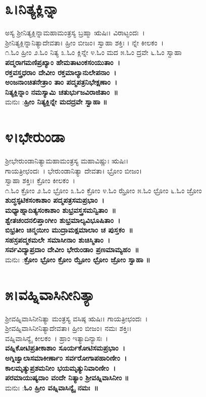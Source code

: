 \section{೩।ನಿತ್ಯಕ್ಲಿನ್ನಾ}
ಅಸ್ಯ ಶ್ರೀನಿತ್ಯಕ್ಲಿನ್ನಾಮಹಾಮಂತ್ರಸ್ಯ ಬ್ರಹ್ಮಾ ಋಷಿಃ। ವಿರಾಟ್ಛಂದಃ~।\\ ಶ್ರೀನಿತ್ಯಕ್ಲಿನ್ನಾನಿತ್ಯಾದೇವತಾ। ಹ್ರೀಂ ಬೀಜಂ। ಸ್ವಾಹಾ ಶಕ್ತಿಃ । ನ್ನೇ ಕೀಲಕಂ~।\\
೧.ಓಂ ಹ್ರೀಂ ೨.ಓಂ ನಿತ್ಯ  ೩.ಓಂ ಕ್ಲಿನ್ನೇ ೪.ಓಂ ಮದ ೫.ಓಂ ದ್ರವೇ ೬.ಓಂ ಸ್ವಾಹಾ\\
{\bfseries ಪದ್ಮರಾಗಮಣಿಪ್ರಖ್ಯಾಂ ಹೇಮತಾಟಂಕಸಂಯುತಾಂ~।\\
ರಕ್ತವಸ್ತ್ರಧರಾಂ ದೇವೀಂ ರಕ್ತಮಾಲ್ಯಾನುಲೇಪನಾಂ~।\\
ಅಂಜನಾಂಚಿತನೇತ್ರಾಂ ತಾಂ ಪದ್ಮಪತ್ರನಿಭೇಕ್ಷಣಾಂ~।\\
ನಿತ್ಯಕ್ಲಿನ್ನಾಂ ನಮಸ್ಯಾಮಿ ಚತುರ್ಭುಜವಿರಾಜಿತಾಂ~॥\\}
ಮನುಃ :{\bfseries  ಹ್ರೀಂ ನಿತ್ಯಕ್ಲಿನ್ನೇ ಮದದ್ರವೇ ಸ್ವಾಹಾ ॥}
\section{೪।ಭೇರುಂಡಾ}
ಶ್ರೀಭೇರುಂಡಾನಿತ್ಯಾಮಹಾಮಂತ್ರಸ್ಯ ಮಹಾವಿಷ್ಣುಃ ಋಷಿಃ। \\ಗಾಯತ್ರೀಛಂದಃ~। ಭೇರುಂಡಾನಿತ್ಯಾ ದೇವತಾ। ಭ್ರೋಂ ಬೀಜಂ।\\ ಸ್ವಾಹಾ ಶಕ್ತಿಃ। ಕ್ರೋಂ ಕೀಲಕಂ~।\\
೧.ಓಂ ಕ್ರೋಂ  ೨.ಓಂ ಭ್ರೋಂ ೩.ಓಂ ಕ್ರೋಂ  ೪.ಓಂ ಝ್ರೋಂ ೫.ಓಂ ಛ್ರೋಂ  ೬.ಓಂ ಜ್ರೋಂ \\
{\bfseries ಶುದ್ಧಸ್ಫಟಿಕಸಂಕಾಶಾಂ ಪದ್ಮಪತ್ರಸಮಪ್ರಭಾಂ~।\\
ಮಧ್ಯಾಹ್ನಾದಿತ್ಯಸಂಕಾಶಾಂ ಶುಭ್ರವಸ್ತ್ರಸಮನ್ವಿತಾಂ~॥\\
ಶ್ವೇತಚಂದನಲಿಪ್ತಾಂಗೀಂ ಶುಭ್ರಮಾಲ್ಯವಿಭೂಷಿತಾಂ~।\\	
ಬಿಭ್ರತೀಂ ಚಿನ್ಮಯೀಂ ಮುದ್ರಾಮಕ್ಷಮಾಲಾಂ ಚ ಪುಸ್ತಕಂ~॥\\
ಸಹಸ್ರಪದ್ಮಕಮಲೇ ಸಮಾಸೀನಾಂ ಶುಚಿಸ್ಮಿತಾಂ~।\\
ಸರ್ವವಿದ್ಯಾಪ್ರದಾಂ ದೇವೀಂ ಭೇರುಂಡಾಂ ಪ್ರಣಮಾಮ್ಯಹಂ~॥\\}
ಮನುಃ :{\bfseries  ಕ್ರೋಂ ಭ್ರೋಂ ಕ್ರೋಂ ಝ್ರೋಂ ಛ್ರೋಂ ಜ್ರೋಂ ಸ್ವಾಹಾ ॥}
\section{೫।ವಹ್ನಿವಾಸಿನೀನಿತ್ಯಾ}
ಶ್ರೀವಹ್ನಿವಾಸಿನೀನಿತ್ಯಾ ಮಂತ್ರಸ್ಯ ವಸಿಷ್ಠ ಋಷಿಃ। ಗಾಯತ್ರೀಛಂದಃ~।\\ ಶ್ರೀವಹ್ನಿವಾಸಿನೀನಿತ್ಯಾದೇವತಾ। ಹ್ರೀಂ ಬೀಜಂ। ನಮಃ ಶಕ್ತಿಃ।\\ ವಹ್ನಿವಾಸಿನ್ಯೈ ಕೀಲಕಂ~। ಹ್ರಾಂ ಇತ್ಯಾದಿನ್ಯಾಸಃ~।\\
{\bfseries ವಹ್ನಿಕೋಟಿಪ್ರತೀಕಾಶಾಂ ಸೂರ್ಯಕೋಟಿಸಮಪ್ರಭಾಂ~।\\
ಅಗ್ನಿಜ್ವಾಲಾಸಮಾಕೀರ್ಣಾಂ ಸರ್ವರೋಗಾಪಹಾರಿಣೀಂ~।\\
ಕಾಲಮೃತ್ಯುಪ್ರಶಮನೀಂ ಭಯಮೃತ್ಯುನಿವಾರಿಣೀಂ~।\\
ಪರಮಾಯುಷ್ಯದಾಂ ವಂದೇ ನಿತ್ಯಾಂ ಶ್ರೀವಹ್ನಿವಾಸಿನೀಂ ॥\\}
ಮನುಃ :{\bfseries ಓಂ ಹ್ರೀಂ ವಹ್ನಿವಾಸಿನ್ಯೈ ನಮಃ~॥}
